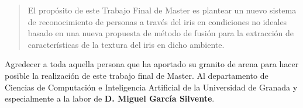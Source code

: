 \documentclass[
11pt, %
spanish, %
doublespacing, %
headsepline, %
]{MastersDoctoralThesis} %
\begin{document}




\begin{abstract}
El propósito de este Trabajo Final de Master es plantear un nuevo sistema de reconocimiento de personas a través del iris en condiciones no ideales basado en una nueva propuesta de método de fusión para la extracción de características de la textura del iris en dicho ambiente.
\end{abstract}

\begin{acknowledgements}
Agredecer a toda aquella persona que ha aportado su granito de arena para hacer posible la realización de este trabajo final de Master. Al departamento de Ciencias de Computación e Inteligencia Artificial de la Universidad de Granada y especialmente a la labor de \textbf{D. Miguel García Silvente}.
\end{acknowledgements}


\tableofcontents %

\listoffigures %


\end{document}
